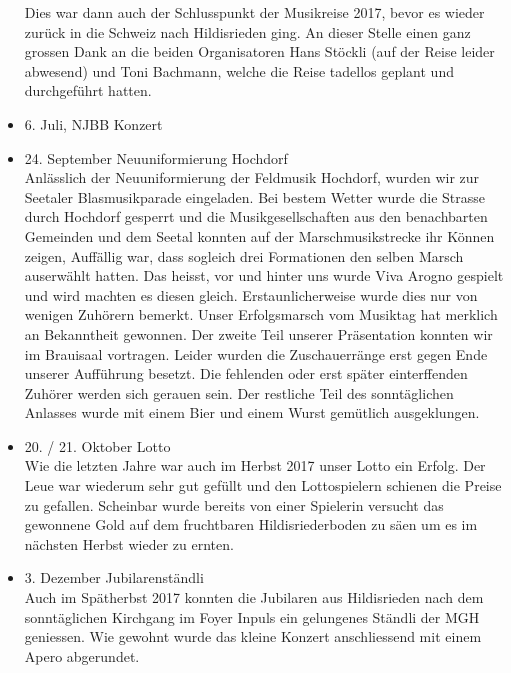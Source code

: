 \begin{history}
\begin{itemize}
                  Dies war dann auch der Schlusspunkt der Musikreise 2017, bevor es
                  wieder zurück in die Schweiz nach Hildisrieden ging. An dieser
                  Stelle einen ganz grossen Dank an die beiden Organisatoren Hans
                  Stöckli (auf der Reise leider abwesend) und Toni Bachmann, welche
                  die Reise tadellos geplant und durchgeführt hatten.


            \item 6. Juli, NJBB Konzert


            \item 24. September Neuuniformierung Hochdorf\\
                  Anlässlich der Neuuniformierung der Feldmusik Hochdorf, wurden wir
                  zur Seetaler Blasmusikparade eingeladen. Bei bestem Wetter wurde
                  die Strasse durch Hochdorf gesperrt und die Musikgesellschaften
                  aus den benachbarten Gemeinden und dem Seetal konnten auf der
                  Marschmusikstrecke ihr Können zeigen, Auffällig war, dass sogleich
                  drei Formationen den selben Marsch auserwählt hatten. Das heisst,
                  vor und hinter uns wurde Viva Arogno gespielt und wird machten es
                  diesen gleich. Erstaunlicherweise wurde dies nur von wenigen
                  Zuhörern bemerkt. Unser Erfolgsmarsch vom Musiktag hat merklich an
                  Bekanntheit gewonnen. Der zweite Teil unserer Präsentation konnten
                  wir im Brauisaal vortragen. Leider wurden die Zuschauerränge erst
                  gegen Ende unserer Aufführung besetzt. Die fehlenden oder erst
                  später einterffenden Zuhörer werden sich gerauen sein. Der
                  restliche Teil des sonntäglichen Anlasses wurde mit einem Bier und
                  einem Wurst gemütlich ausgeklungen.

            \item 20. / 21. Oktober Lotto\\
                  Wie die letzten Jahre war auch im Herbst 2017 unser Lotto ein
                  Erfolg. Der Leue war wiederum sehr gut gefüllt und den
                  Lottospielern schienen die Preise zu gefallen. Scheinbar wurde
                  bereits von einer Spielerin versucht das gewonnene Gold auf dem
                  fruchtbaren Hildisriederboden zu säen um es im nächsten Herbst
                  wieder zu ernten.

            \item 3. Dezember Jubilarenständli\\
                  Auch im Spätherbst 2017 konnten die Jubilaren aus Hildisrieden
                  nach dem sonntäglichen Kirchgang im Foyer Inpuls ein gelungenes
                  Ständli der MGH geniessen. Wie gewohnt wurde das kleine Konzert
                  anschliessend mit einem Apero abgerundet.

      \end{itemize}

\end{history}
